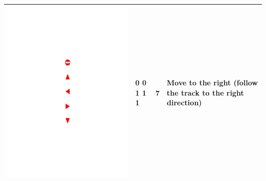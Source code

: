 \documentclass[conference]{IEEEtran}
\begin{document}
\begin{table}[!h]
\begin{tabular}{|c|C{1.5cm}|C{1.5cm}|C{2.3cm}|}
				\begin{minipage}{.075\textwidth}\includegraphics[scale=.5,trim=9.1cm 10.75cm 9.5cm 15.75cm,clip]{signs.pdf}\end{minipage}	& 0 0 1 1 1 & 7 & Move to the right (follow the track to the right direction) \\ \hline

\end{tabular}
\end{table}
\end{document}
